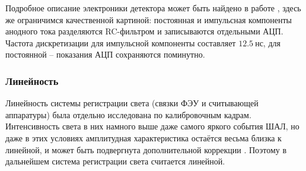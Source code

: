 Подробное описание электроники детектора может быть найдено в работе \cite{SphereDetector2020}, здесь же ограничимся качественной картиной: постоянная и импульсная компоненты анодного тока разделяются RC-фильтром и записываются отдельными АЦП. Частота дискретизации для импульсной компоненты составляет $12.5~\text{нс}$, для постоянной -- показания АЦП сохраняются поминутно.

\subsubsection{Линейность}

Линейность системы регистрации света (связки ФЭУ и считывающей аппаратуры) была отдельно исследована по калибровочным кадрам. Интенсивность света в них намного выше даже самого яркого события ШАЛ, но даже в этих условиях амплитудная характеристика остаётся весьма близка к линейной, и может быть подвергнута дополнительной коррекции \cite[рис. 6]{SphereCalibration2016}. Поэтому в дальнейшем система регистрации света считается линейной.
